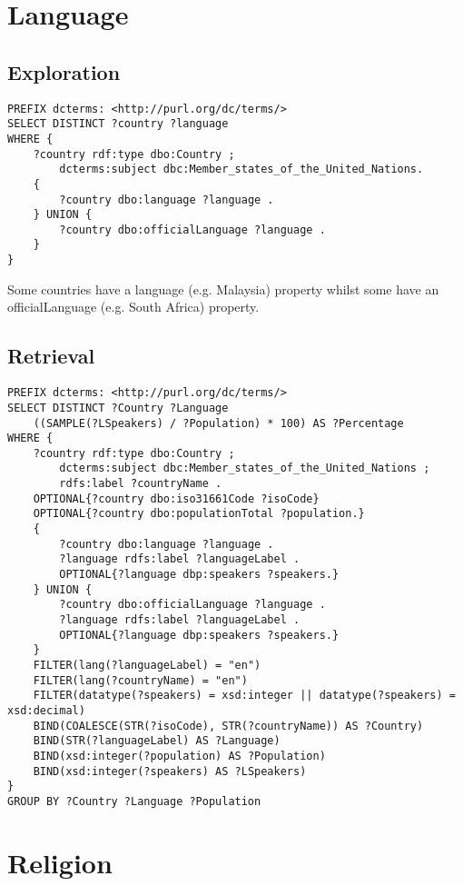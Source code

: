 \documentclass[11pt]{article}
\begin{document}
\newpage
\section{Language}
\subsection{Exploration}
{\footnotesize\begin{verbatim}
PREFIX dcterms: <http://purl.org/dc/terms/>
SELECT DISTINCT ?country ?language
WHERE {
    ?country rdf:type dbo:Country ;
        dcterms:subject dbc:Member_states_of_the_United_Nations.
    {
        ?country dbo:language ?language .
    } UNION {
        ?country dbo:officialLanguage ?language .
    }
}
\end{verbatim}}

Some countries have a language (e.g. Malaysia) property whilst some have an officialLanguage (e.g. South Africa) property. 


\subsection{Retrieval}
{\footnotesize\begin{verbatim}
PREFIX dcterms: <http://purl.org/dc/terms/>
SELECT DISTINCT ?Country ?Language
    ((SAMPLE(?LSpeakers) / ?Population) * 100) AS ?Percentage
WHERE {
    ?country rdf:type dbo:Country ;
        dcterms:subject dbc:Member_states_of_the_United_Nations ;
        rdfs:label ?countryName .
    OPTIONAL{?country dbo:iso31661Code ?isoCode}
    OPTIONAL{?country dbo:populationTotal ?population.}
    {
        ?country dbo:language ?language .
        ?language rdfs:label ?languageLabel .
        OPTIONAL{?language dbp:speakers ?speakers.}
    } UNION {
        ?country dbo:officialLanguage ?language .
        ?language rdfs:label ?languageLabel .
        OPTIONAL{?language dbp:speakers ?speakers.}
    }
    FILTER(lang(?languageLabel) = "en")
    FILTER(lang(?countryName) = "en")
    FILTER(datatype(?speakers) = xsd:integer || datatype(?speakers) = xsd:decimal)
    BIND(COALESCE(STR(?isoCode), STR(?countryName)) AS ?Country)
    BIND(STR(?languageLabel) AS ?Language)
    BIND(xsd:integer(?population) AS ?Population)
    BIND(xsd:integer(?speakers) AS ?LSpeakers)
}
GROUP BY ?Country ?Language ?Population
\end{verbatim}}

\section{Religion}
\end{document}
